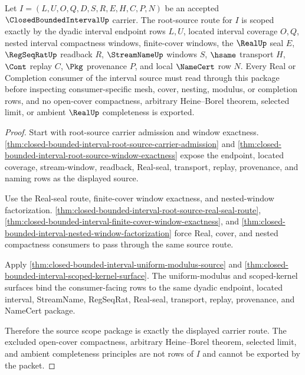 \begin{theorem}
\label{thm:closed-bounded-interval-source-scope-package}
Let $I=(L,U,O,Q,D,S,R,E,H,C,P,N)$ be an accepted $\ClosedBoundedIntervalUp$ carrier. The root-source route for $I$ is scoped exactly by the dyadic interval endpoint rows $L,U$, located interval coverage $O,Q$, nested interval compactness windows, finite-cover windows, the $\RealUp$ seal $E$, $\RegSeqRatUp$ readback $R$, $\StreamNameUp$ windows $S$, $\hsame$ transport $H$, $\Cont$ replay $C$, $\Pkg$ provenance $P$, and local $\NameCert$ row $N$. Every Real or Completion consumer of the interval source must read through this package before inspecting consumer-specific mesh, cover, nesting, modulus, or completion rows, and no open-cover compactness, arbitrary Heine--Borel theorem, selected limit, or ambient $\RealUp$ completeness is exported.
\end{theorem}
\begin{proof}
Start with root-source carrier admission and window exactness. \autoref{thm:closed-bounded-interval-root-source-carrier-admission} and \autoref{thm:closed-bounded-interval-root-source-window-exactness} expose the endpoint, located coverage, stream-window, readback, Real-seal, transport, replay, provenance, and naming rows as the displayed source.

Use the Real-seal route, finite-cover window exactness, and nested-window factorization. \autoref{thm:closed-bounded-interval-root-source-real-seal-route}, \autoref{thm:closed-bounded-interval-finite-cover-window-exactness}, and \autoref{thm:closed-bounded-interval-nested-window-factorization} force Real, cover, and nested compactness consumers to pass through the same source route.

Apply \autoref{thm:closed-bounded-interval-uniform-modulus-source} and \autoref{thm:closed-bounded-interval-scoped-kernel-surface}. The uniform-modulus and scoped-kernel surfaces bind the consumer-facing rows to the same dyadic endpoint, located interval, StreamName, RegSeqRat, Real-seal, transport, replay, provenance, and NameCert package.

Therefore the source scope package is exactly the displayed carrier route. The excluded open-cover compactness, arbitrary Heine--Borel theorem, selected limit, and ambient completeness principles are not rows of $I$ and cannot be exported by the packet.
\end{proof}

